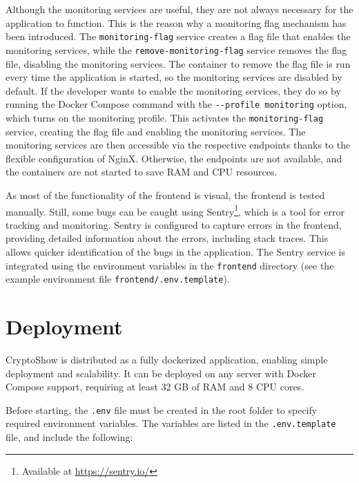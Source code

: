 Although the monitoring services are useful, they are not always necessary for the application to function. This is the reason why a monitoring flag mechanism has been introduced. The \lstinline!monitoring-flag! service creates a flag file that enables the monitoring services, while the \lstinline!remove-monitoring-flag! service removes the flag file, disabling the monitoring services. The container to remove the flag file is run every time the application is started, so the monitoring services are disabled by default. If the developer wants to enable the monitoring services, they do so by running the Docker Compose command with the \lstinline|--profile monitoring| option, which turns on the monitoring profile. This activates the \lstinline!monitoring-flag! service, creating the flag file and enabling the monitoring services. The monitoring services are then accessible via the respective endpoints thanks to the flexible configuration of NginX. Otherwise, the endpoints are not available, and the containers are not started to save RAM and CPU resources.

As most of the functionality of the frontend is visual, the frontend is tested manually. Still, some bugs can be caught using Sentry\footnote{Available at \url{https://sentry.io/}}, which is a tool for error tracking and monitoring. Sentry is configured to capture errors in the frontend, providing detailed information about the errors, including stack traces. This allows quicker identification of the bugs in the application. The Sentry service is integrated using the environment variables in the \lstinline|frontend| directory (see the example environment file \lstinline!frontend/.env.template!).

\section{Deployment}
\label{sec:deployment}

CryptoShow is distributed as a fully dockerized application, enabling simple deployment and scalability. It can be deployed on any server with Docker Compose support, requiring at least 32 GB of RAM and 8 CPU cores.

Before starting, the \lstinline|.env| file must be created in the root folder to specify required environment variables. The variables are listed in the \lstinline|.env.template| file, and include the following:

